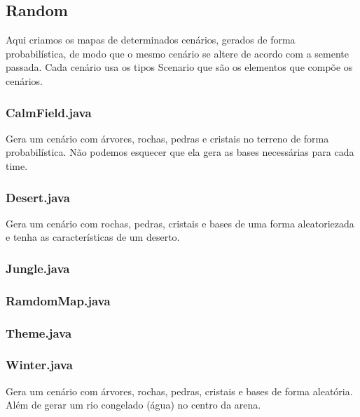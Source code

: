 \documentclass[a4paper]{article}
\begin{document}
\newpage %

	\subsection{Random}
	    Aqui criamos os mapas de determinados cenários,
	    gerados de forma probabilística, de modo que
	    o mesmo cenário se altere de acordo com a semente
	    passada. Cada cenário usa os tipos Scenario que são
	    os elementos que compõe os cenários.
	    
		\subsubsection{ CalmField.java }
		    Gera um cenário com árvores, rochas, pedras e 
		    cristais no terreno de forma probabilística.
		    Não podemos esquecer que ela gera as bases
		    necessárias para cada time.
		    
		\subsubsection{ Desert.java }
		    Gera um cenário com rochas, pedras, cristais e
		    bases de uma forma aleatoriezada e tenha as
		    características de um deserto.
		    
		\subsubsection{ Jungle.java }
		
		\subsubsection{ RamdomMap.java }
		
		\subsubsection{ Theme.java }
		
		\subsubsection{ Winter.java }
		    Gera um cenário com árvores, rochas, pedras, 
		    cristais e bases de forma aleatória. Além de
		    gerar um rio congelado (água) no centro da arena.
		    

\newpage %
\end{document}
